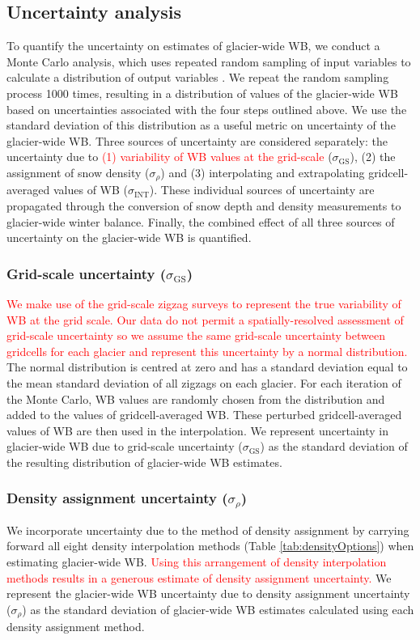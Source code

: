 \documentclass[review,oneside, letterpaper]{igs}
\begin{document}
\subsection{Uncertainty analysis}

To quantify the uncertainty on estimates of glacier-wide WB, we conduct a Monte Carlo analysis, which uses repeated random sampling of input variables to calculate a distribution of output variables \citep{Metropolis1949}. We repeat the random sampling process 1000 times, resulting in a distribution of values of the glacier-wide WB based on uncertainties associated with the four steps outlined above. We use the standard deviation of this distribution as a useful metric on uncertainty of the glacier-wide WB. Three sources of uncertainty are considered separately: the uncertainty due to \textcolor{red}{(1) variability of WB values at the grid-scale} ($\sigma_{\mathrm{GS}}$), (2) the assignment of snow density ($\sigma_{\rho}$) and (3) interpolating and extrapolating gridcell-averaged values of WB ($\sigma_{\mathrm{INT}}$). These individual sources of uncertainty are propagated through the conversion of snow depth and density measurements to glacier-wide winter balance. Finally, the combined effect of all three sources of uncertainty on the glacier-wide WB is quantified.

	\subsubsection{Grid-scale uncertainty ($\sigma_{\mathrm{GS}}$)}
\textcolor{red}{We make use of the grid-scale zigzag surveys to represent the true variability of WB at the grid scale. Our data do not permit a spatially-resolved assessment of grid-scale uncertainty so we assume the same grid-scale uncertainty between gridcells for each glacier and represent this uncertainty by a normal distribution. }The normal distribution is centred at zero and has a standard deviation equal to the mean standard deviation of all zigzags on each glacier. For each iteration of the Monte Carlo, WB values are randomly chosen from the distribution and added to the values of gridcell-averaged WB. These perturbed gridcell-averaged values of WB are then used in the interpolation. We represent uncertainty in glacier-wide WB due to grid-scale uncertainty ($\sigma_{\mathrm{GS}}$) as the standard deviation of the resulting distribution of glacier-wide WB estimates.  

	\subsubsection{Density assignment uncertainty ($\sigma_{\rho}$)}
We incorporate uncertainty due to the method of density assignment by carrying forward all eight density interpolation methods (Table \ref{tab:densityOptions}) when estimating glacier-wide WB. \textcolor{red}{Using this arrangement of density interpolation methods results in a generous estimate of density assignment uncertainty.} We represent the glacier-wide WB uncertainty due to density assignment uncertainty ($\sigma_{\rho}$) as the standard deviation of glacier-wide WB estimates calculated using each density assignment method.
\end{document}
